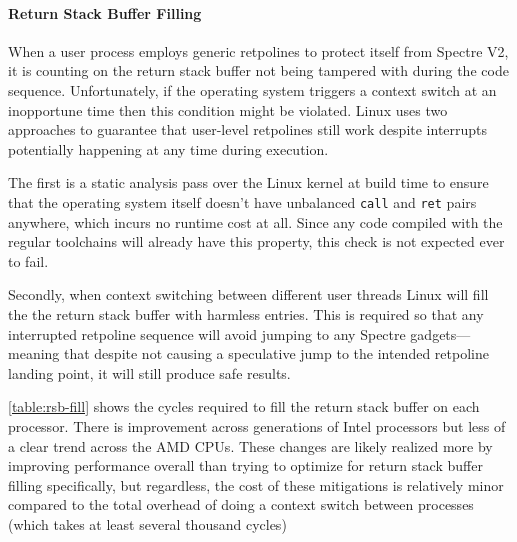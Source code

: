\paragraph{Return Stack Buffer Filling}

When a user process employs generic retpolines to protect itself from Spectre V2, it is counting on the return stack buffer not being tampered with during the code sequence.
Unfortunately, if the operating system triggers a context switch at an inopportune time then this condition might be violated.
Linux uses two approaches to guarantee that user-level retpolines still work despite interrupts potentially happening at any time during execution.

The first is a static analysis pass over the Linux kernel at build time to ensure that the operating system itself doesn't have  unbalanced \texttt{call} and \texttt{ret} pairs anywhere, which incurs no runtime cost at all.
Since any code compiled with the regular toolchains will already have this property, this check is not expected ever to fail.

Secondly, when context switching between different user threads Linux will fill the the return stack buffer with harmless entries.
This is required so that any interrupted retpoline sequence will avoid jumping to any Spectre gadgets---meaning that despite not causing a speculative jump to the intended retpoline landing point, it will still produce safe results.

\autoref{table:rsb-fill} shows the cycles required to fill the return stack buffer on each processor.
There is improvement across generations of Intel processors but less of a clear trend across the AMD CPUs.
These changes are likely realized more by improving performance overall
than trying to optimize for return stack buffer filling specifically, but regardless, the cost of these mitigations is relatively minor compared to the total overhead of doing a context switch between processes (which takes at least several thousand cycles)

